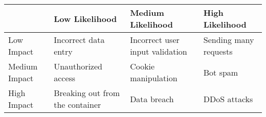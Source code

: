 \begin{tabular}{| m{3cm} | m{4cm} | m{4cm} | m{4cm} |}
\hline
 & Low Likelihood & Medium Likelihood & High Likelihood \\
\hline
Low Impact & Incorrect data entry & Incorrect user input validation & Sending many requests \\
\hline
Medium Impact & Unauthorized access & Cookie manipulation & Bot spam \\
\hline
High Impact & Breaking out from the container & Data breach & DDoS attacks \\
\hline
\end{tabular}